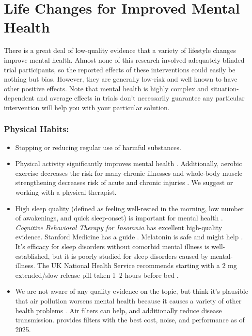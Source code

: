 \documentclass[12pt,letterpaper]{book}
\begin{document}
\chapter{Life Changes for Improved Mental Health}
\label{sec:lifechanges}
There is a great deal of low-quality evidence that a variety of lifestyle changes improve mental health. Almost none of this research involved adequately blinded trial participants, so the reported effects of these interventions could easily be nothing but bias. However, they are generally low-risk and well known to have other positive effects. Note that mental health is highly complex and situation-dependent and average effects in trials don't necessarily guarantee any particular intervention will help you with your particular solution.
\subsection*{Physical Habits:}
\begin{itemize}
   \item Stopping or reducing regular use of harmful substances.
   \item Physical activity significantly improves mental health \cite{activityMetaAnalysis}. Additionally, aerobic exercise decreases the risk for many chronic illnesses \cite{liebermanExercised} and whole-body muscle strengthening decreases risk of acute and chronic injuries \cite{lauersenStrength}. We suggest \textcite{lowBodyweight} or working with a physical therapist.
   \item High sleep quality (defined as feeling well-rested in the morning, low number of awakenings, and quick sleep-onset) is important for  mental health \cite{scottSleep}. \textit{Cognitive Behavioral Therapy for Insomnia} has excellent high-quality evidence. Stanford Medicine has a guide \cite{stanfordSleep}. Melatonin is safe and might help \cite{moon2022role}. It's efficacy for sleep disorders without comorbid mental illness is well-established, but it is poorly studied for sleep disorders caused by mental-illness. The UK National Health Service recommends starting with a 2 mg extended/slow release pill taken 1–2 hours before bed \cite{nhsMelatonin}.
   \item We are not aware of any quality evidence on the topic, but think it's plausible that air pollution worsens mental health because it causes a variety of other health problems \cite{airPollution}. Air filters can help, and additionally reduce disease transmission. \textcite{cleanAir} provides filters with the best cost, noise, and performance as of 2025.
\end{itemize}
\end{document}
